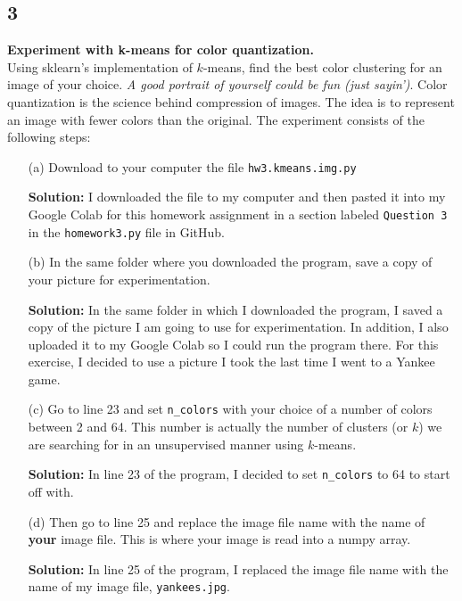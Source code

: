 \documentclass[a4paper]{article}
\begin{document}
\subsection{3} \textbf{Experiment with k-means for color quantization.}\\
Using sklearn’s implementation of $k$-means, find the best color clustering for an image of your 
choice. \textit{A good portrait of yourself could be fun (just sayin’)}.  Color quantization is 
the science behind compression of images. The idea is to represent an image with fewer colors 
than the original. The experiment consists of the following steps:
\begin{itemize}
    \item[(a)] Download to your computer the file \verb|hw3.kmeans.img.py|
    
    \textbf{Solution:} I downloaded the file to my computer and then pasted it into my Google 
    Colab for this homework assignment in a section labeled \verb|Question 3| in the \verb|homework3.py| 
    file in GitHub.
    
    \item[(b)] In the same folder where you downloaded the program, save a copy of your picture 
    for experimentation.

    \textbf{Solution:} In the same folder in which I downloaded the program, I saved a copy 
    of the picture I am going to use for experimentation.  In addition, I also uploaded it to 
    my Google Colab so I could run the program there.  For this exercise, I decided to use a 
    picture I took the last time I went to a Yankee game.

    \item[(c)] Go to line 23 and set \verb|n_colors| with your choice of a number of colors 
    between 2 and 64. This number is actually the number of clusters (or $k$) we are searching 
    for in an unsupervised manner using $k$-means.
    
    \textbf{Solution:} In line 23 of the program, I decided to set \verb|n_colors| to 64 to 
    start off with.
    
    \item[(d)]  Then go to line 25 and replace the image file name with the name of \textbf{your} 
    image file. This is where your image is read into a numpy array.

    \textbf{Solution:} In line 25 of the program, I replaced the image file name with the name of 
    my image file, \verb|yankees.jpg|.


\end{itemize}
\end{document}
